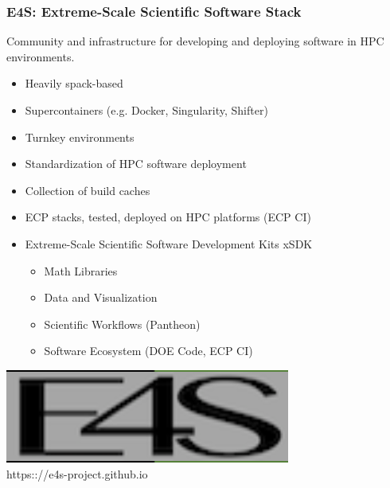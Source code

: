\begin{frame}\frametitle{E4S: Extreme-Scale Scientific Software Stack}
Community and infrastructure for developing and deploying software in HPC environments.
\begin{multicols}{2}
\begin{itemize}
\item Heavily spack-based %
\item Supercontainers (e.g. Docker, Singularity, Shifter)
\item Turnkey environments
\item Standardization of HPC software deployment
\item Collection of build caches
\item ECP stacks, tested, deployed on HPC platforms (ECP CI)
\item Extreme-Scale Scientific Software Development Kits xSDK
\begin{itemize}
\item Math Libraries
\item Data and Visualization
\item Scientific Workflows (Pantheon)
\item Software Ecosystem (DOE Code, ECP CI)
\end{itemize}
\end{itemize}
\end{multicols}
\begin{center}
\includegraphics[width=.5\textwidth]{figures/e4s.png}\\
https:://e4s-project.github.io
\end{center}
\end{frame}

